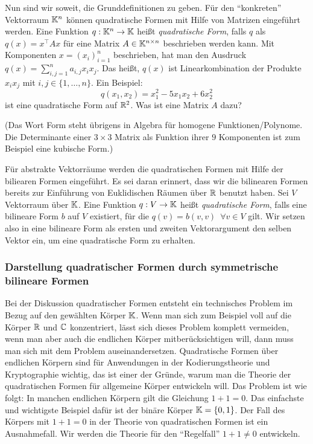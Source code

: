 %
Nun sind wir soweit, die Grunddefinitionen zu geben. 
Für den ``konkreten'' Vektorraum $\mathbb K^n$ können quadratische Formen mit Hilfe von Matrizen eingeführt werden. 
Eine Funktion $ q : \mathbb K^n \to \mathbb K $ heißt \emph{quadratische Form}, %
falls $ q $ als $ q(x) = x^\top Ax $ für eine Matrix $ A \in \mathbb K^{n \times n} $ beschrieben werden kann. Mit Komponenten $x=(x_i)_{i=1}^n$ beschrieben, hat man den Ausdruck $q(x) = \sum_{i,j=1}^n a_{i,j} x_i x_j$. Das heißt, $q(x)$ ist Linearkombination der Produkte $x_i x_j$ mit $i,j \in \{1,\dots,n\}$. Ein Beispiel: 
\[
	q(x_1,x_2) = x_1^2 - 5 x_1 x_2 + 6 x_2^2
\]
ist eine quadratische Form auf $\mathbb R^2$. Was ist eine Matrix $A$ dazu? 

(Das Wort Form steht übrigens in Algebra für homogene Funktionen/Polynome. Die Determinante einer $3 \times 3$ Matrix als Funktion ihrer $9$ Komponenten ist zum Beispiel eine kubische Form.)

Für abstrakte Vektorräume werden die quadratischen Formen mit Hilfe der biliearen Formen eingeführt. Es sei daran erinnert, dass wir die bilinearen Formen bereits zur Einführung von Euklidischen Räumen über $\mathbb R$ benutzt haben. 
Sei $ V $ Vektorraum über $ \mathbb K $. Eine Funktion $ q : V \to \mathbb K $ heißt \emph{quadratische Form}, falls eine bilineare Form $ b $ auf $ V $ existiert, für die $ q(v) = b(v,v) \enspace \forall v \in V $ gilt. Wir setzen also in eine bilineare Form als ersten und zweiten Vektorargument den selben Vektor ein, um eine quadratische Form zu erhalten. 

\subsubsection{Darstellung quadratischer Formen durch symmetrische bilineare Formen}

Bei der Diskussion quadratischer Formen entsteht ein technisches Problem im Bezug auf den gewählten Körper $\mathbb K$.  Wenn man sich zum Beispiel voll auf die Körper $\mathbb R$ und $\mathbb C$ konzentriert, lässt sich dieses Problem komplett vermeiden, wenn man aber auch die endlichen Körper mitberücksichtigen will, dann muss man sich mit dem Problem auseinandersetzen. Quadratische Formen über endlichen Körpern sind für Anwendungen in der Kodierungstheorie und Kryptographie wichtig, das ist einer der Gründe, warum man die Theorie der quadratischen Formen für allgemeine Körper entwickeln will. Das Problem ist wie folgt: In manchen endlichen Körpern gilt die Gleichung $1+ 1 =0$. Das einfachste und wichtigste Beispiel dafür ist der binäre Körper $\mathbb K = \{0,1\}$. Der Fall des Körpers mit $1+1=0$ in der Theorie von quadratischen Formen ist ein Ausnahmefall. Wir werden die Theorie für den  ``Regelfall'' $1+1 \ne 0$ entwickeln. 

